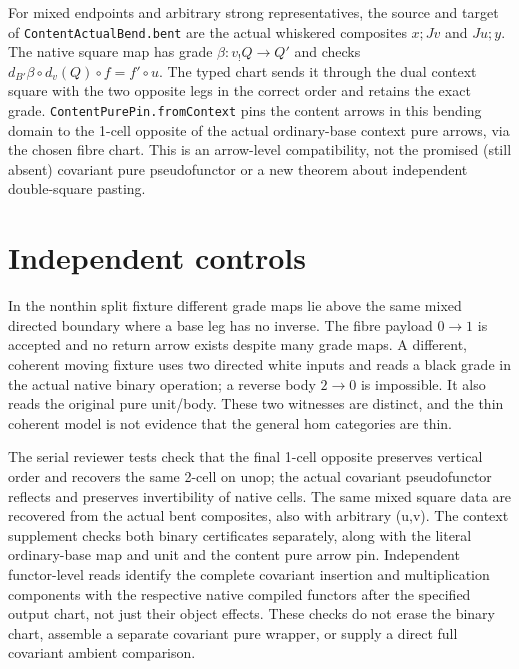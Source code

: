 \documentclass[11pt]{article}
\newcommand{\nm}[1]{\nolinkurl{#1}}
\begin{document}
For mixed endpoints and arbitrary strong representatives, the
source and target of \nm{ContentActualBend.bent} are the actual
whiskered composites $x;Jv$ and $Ju;y$. The native square map has
grade $\beta:v_!Q\to Q'$ and checks
$d_{B'}\beta\circ d_v(Q)\circ f=f'\circ u$.
The typed chart sends it through the dual context square with the
two opposite legs in the correct order and retains the exact grade.
\nm{ContentPurePin.fromContext} pins the content arrows in this
bending domain to the 1-cell opposite of the actual ordinary-base
context pure arrows, via the chosen fibre chart. This is an
arrow-level compatibility, not the promised (still absent)
covariant pure pseudofunctor or a new theorem about independent
double-square pasting.


\section*{Independent controls}
In the nonthin split fixture different grade maps lie above the same
mixed directed boundary where a base leg has no inverse. The fibre
payload $0\to1$ is accepted and no return arrow exists despite many
grade maps. A different, coherent moving fixture uses two directed white
inputs and reads a black grade in the actual native binary operation;
a reverse body $2\to0$ is impossible. It also reads the original pure
unit/body. These two witnesses are distinct, and the thin coherent model
is not evidence that the general hom categories are thin.

The serial reviewer tests check that the final 1-cell opposite preserves
vertical order and recovers the same 2-cell on unop; the actual
covariant pseudofunctor reflects and preserves invertibility of native
cells. The same mixed square data are recovered from the actual bent
composites, also with arbitrary (u,v).
The context supplement checks both binary certificates separately,
along with the literal ordinary-base map and unit and the content pure
arrow pin. Independent functor-level reads identify the complete
covariant insertion and multiplication components with the respective
native compiled functors after the specified output chart, not just
their object effects. These checks do not erase the binary chart,
assemble a separate covariant pure wrapper, or supply a direct full
covariant ambient comparison.
\end{document}
